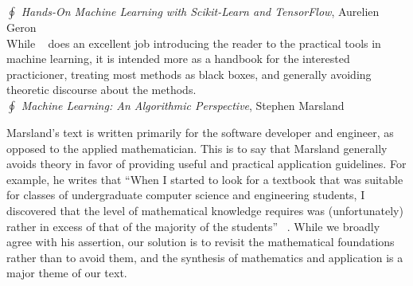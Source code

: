 \documentclass[10pt]{article}
\newenvironment{changemargin}[2]{%
\begin{list}{}{%
\setlength{\topsep}{0pt}%
\setlength{\leftmargin}{#1}%
\setlength{\rightmargin}{#2}%
\setlength{\listparindent}{\parindent}%
\setlength{\itemindent}{\parindent}%
\setlength{\parsep}{\parskip}%
}%
\item[]}{\end{list}}
\renewcommand{\it}{\textit}
\begin{document}
\begin{changemargin}{+-1cm}{-3cm}
$\oint$ \it{Hands-On Machine Learning with Scikit-Learn and TensorFlow}, Aurelien Geron \\

While ~\cite{geron2017hands} does an excellent job introducing the reader to the practical tools in machine learning, it is intended more as a handbook for the interested practicioner, treating most methods as black boxes, and generally avoiding theoretic discourse about the methods. \\

$\oint$ \it{Machine Learning: An Algorithmic Perspective}, Stephen Marsland

Marsland's text is written primarily for the software developer and engineer, as opposed to the applied mathematician. This is to say that Marsland generally avoids theory in favor of providing useful and practical application guidelines. For example, he writes that ``When I started to look for a textbook that was suitable for classes of undergraduate computer science and engineering students, I discovered that the level of mathematical knowledge requires was (unfortunately) rather in excess of that of the majority of the students'' ~\cite{marsland2015machine}. While we broadly agree with his assertion, our solution is to revisit the mathematical foundations rather than to avoid them, and the synthesis of mathematics and application is a major theme of our text.




\end{changemargin}
\end{document}
